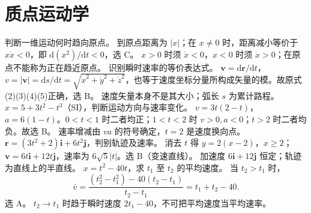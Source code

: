 \section{质点运动学}
\problemtext 判断一维运动何时趋向原点。
\workings 到原点距离为 $|x|$；在 $x\ne0$ 时，距离减小等价于 $x\dot x<0$，即 $\mathrm d(x^2)/\mathrm dt<0$，选 C。
\crosscheck $x>0$ 时须 $\dot x<0$，$x<0$ 时须 $\dot x>0$；在原点不能称为正在趋近原点。
\problemtext 识别瞬时速率的等价表达式。
\workings $\bm v=\mathrm d\bm r/\mathrm dt$，$v=|\bm v|=\mathrm ds/\mathrm dt=\sqrt{\dot x^2+\dot y^2+\dot z^2}$，也等于速度坐标分量所构成矢量的模。故原式(2)(3)(4)(5)正确，选 B。
\crosscheck 速度矢量本身不是其大小；弧长 $s$ 为累计路程。
\problemtext $x=5+3t^2-t^3$（SI），判断运动方向与速率变化。
\workings $v=3t(2-t)$，$a=6(1-t)$。$0<t<1$ 时二者均正；$1<t<2$ 时 $v>0,a<0$；$t>2$ 时二者均负。故选 B。
\crosscheck 速率增减由 $va$ 的符号确定，$t=2$ 是速度换向点。
\problemtext $\bm r=(3t^2+2)\bm i+6t^2\bm j$，判别轨迹及速率。
\workings 消去 $t$ 得 $y=2(x-2)$，$x\ge2$；$\bm v=6t\bm i+12t\bm j$，速率为 $6\sqrt5|t|$。选 B（变速直线）。
\crosscheck 加速度 $6\bm i+12\bm j$ 恒定；轨迹为直线上的半直线。
\problemtext $x=t^2-40t$，求 $t_1$ 至 $t_2$ 的平均速度。
\workings 当 $t_2>t_1$ 时，
\[
\bar v=\frac{(t_2^2-t_1^2)-40(t_2-t_1)}{t_2-t_1}=t_1+t_2-40.
\]
选 A。
\crosscheck $t_2\to t_1$ 时趋于瞬时速度 $2t_1-40$，不可把平均速度当平均速率。

